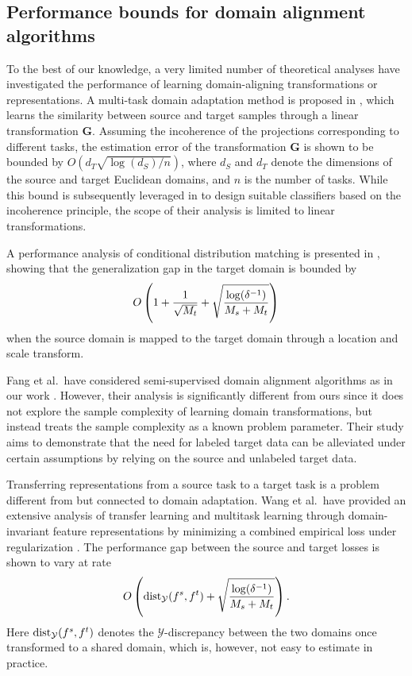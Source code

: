 \documentclass[review,supplement,onefignum,onetabnum]{siamonline250211}
\begin{document}
\subsection{Performance bounds for domain alignment algorithms}

To the best of our knowledge,  a very limited number of theoretical analyses have investigated the performance of learning domain-aligning transformations or representations. A multi-task domain adaptation method is proposed in \cite{ZhouTPT19}, which learns the similarity between source and target samples through a linear transformation $\mathbf{G}$. Assuming the incoherence of the projections corresponding to different tasks, the estimation error of the transformation $\mathbf{G}$ is shown to be bounded by $O(d_T \sqrt{\log(d_S)/n})$, where $d_S$ and $d_T$ denote the dimensions of the source and target Euclidean domains, and $n$ is the number of tasks. While this bound is subsequently leveraged in \cite{ZhouTPT19} to design suitable classifiers based on the incoherence principle, the scope of their analysis is limited to linear transformations. 

A performance analysis of conditional distribution matching is presented in \cite{WangS15}, showing that  the generalization gap in the target domain is bounded by
%
\[
O\left (  1+ \frac{1}{\sqrt{M_t}} + \sqrt{\frac{\log(\delta^{-1})}{M_s + M_t}} \right)
\]
%
when the source domain is mapped to the target domain through a location and scale transform. 

Fang et al.~have considered semi-supervised domain alignment algorithms  as in our work  \cite{FangLLZ23}. However, their analysis is significantly different from ours since it does not explore the sample complexity of learning domain transformations, but instead treats the sample complexity as a known problem parameter. Their study aims to demonstrate that the need for labeled target data can be alleviated under certain assumptions by relying on the source and unlabeled target data. 
%



Transferring representations from a source task to a target task is a problem different from but connected to domain adaptation. Wang et al.~have provided an extensive analysis of  transfer learning and multitask learning through domain-invariant feature representations by minimizing a combined empirical loss under regularization \cite{WangMSX23}. The performance gap between the source and target losses is shown to vary at rate
%
\[
O\left(\text{dist}_{\mathcal{Y}}(f^s, f^t) + \sqrt{ \frac{\log(\delta^{-1})}{M_s + M_t}} \right).
\]
%
Here $\text{dist}_{\mathcal{Y}}(f^s, f^t)$ denotes the $\mathcal{Y}$-discrepancy \cite{MohriM12} between the two domains once transformed to a shared domain, which is, however, not easy to estimate in practice. 
\end{document}
